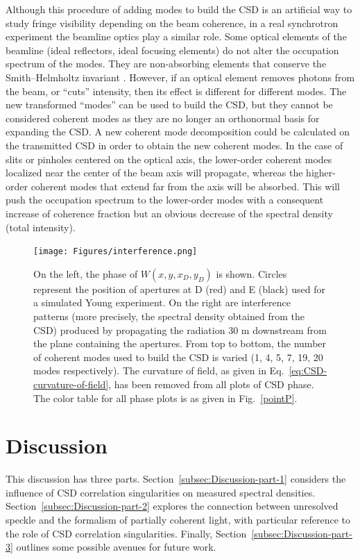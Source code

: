 \documentclass[%
 reprint,
 amsmath,amssymb,
 aps,
]{revtex4-1}
\begin{document}
Although this procedure of adding modes to build the CSD is an artificial way to study fringe visibility depending on the beam coherence, in a real synchrotron experiment the beamline optics play a similar role. Some optical elements of the beamline (ideal reflectors, ideal focusing elements) do not alter the occupation spectrum of the modes. They are non-absorbing elements that conserve the Smith--Helmholtz invariant \cite{BornWolf}. However, if an optical element removes photons from the beam, or ``cuts'' intensity, then its effect is different for different modes. The new transformed ``modes'' can be used to build the CSD, but they cannot be considered coherent modes as they are no longer an orthonormal basis for expanding the CSD. A new coherent mode decomposition could be calculated on the transmitted CSD in order to obtain the new coherent modes. In the case of slits or pinholes centered on the optical axis, the lower-order coherent modes localized near the center of the beam axis will propagate, whereas the higher-order coherent modes that extend far from the axis will be absorbed. This will push the occupation spectrum to the lower-order modes with a consequent increase of coherence fraction but an obvious decrease of the spectral density (total intensity).     

\begin{figure}
\texttt{[image: Figures/interference.png]}
\caption{On the left, the phase of $W(x,y,x_{D},y_{D})$ is shown. Circles represent the position of apertures at D (red) and E (black) used for a simulated Young experiment. On the right are interference patterns (more precisely, the spectral density obtained from the CSD) produced by propagating the radiation 30 m downstream from the plane containing the apertures. From top to bottom, the number of coherent modes used to build the CSD is varied (1, 4, 5, 7, 19, 20 modes respectively). The curvature of field, as given in Eq.~\ref{eq:CSD-curvature-of-field}, has been removed from all plots of CSD phase. The color table for all phase plots is as given in Fig.~\ref{pointP}.}
\label{young}
\end{figure}

\section{Discussion}

This discussion has three parts.  Section~\ref{subsec:Discussion-part-1} considers the influence of CSD correlation singularities on measured spectral densities.  Section~\ref{subsec:Discussion-part-2} explores the connection between unresolved speckle and the formalism of partially coherent light, with particular reference to the role of CSD correlation singularities.  Finally, Section~\ref{subsec:Discussion-part-3} outlines some possible avenues for future work.  
\end{document}
